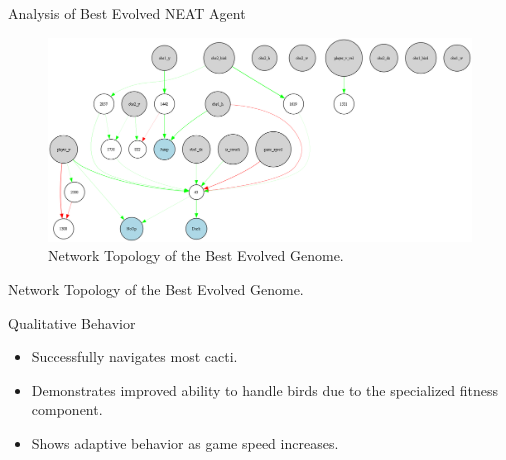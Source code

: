 \documentclass{beamer}
\begin{document}
\begin{frame}{Analysis of Best Evolved NEAT Agent}
      \begin{figure}
          \centering
          \includegraphics[width=0.8\linewidth]{media/best_genome_network.png} %
          \caption{Network Topology of the Best Evolved Genome.}
          \label{fig:best-network-qualitative} %
      \end{figure}
      \tiny Network Topology of the Best Evolved Genome.
      \begin{block}{\tiny Qualitative Behavior}
          \begin{itemize}
              \item Successfully navigates most cacti.
              \item Demonstrates improved ability to handle birds due to the specialized fitness component.
              \item Shows adaptive behavior as game speed increases.
          \end{itemize}
      \end{block}
\end{frame}
\end{document}
